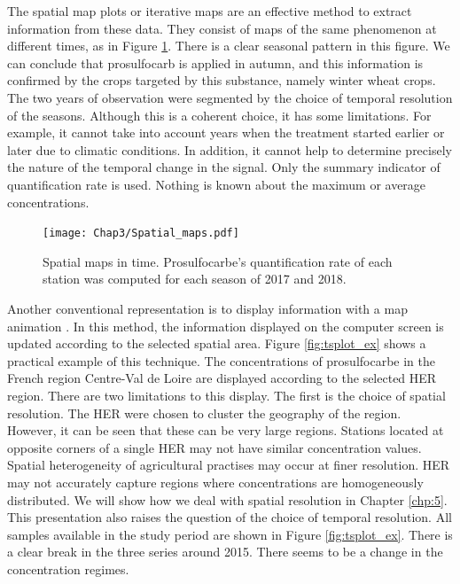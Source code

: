 The spatial map plots or iterative maps \citep{Andrienko2003} are an effective method to extract information from these data. They consist of maps of the same phenomenon at different times, as in Figure \ref{fig:spa_ex}. There is a clear seasonal pattern in this figure. We can conclude that prosulfocarb is applied in autumn, and this information is confirmed by the crops targeted by this substance, namely winter wheat crops. The two years of observation were segmented by the choice of temporal resolution of the seasons. Although this is a coherent choice, it has some limitations. For example, it cannot take into account years when the treatment started earlier or later due to climatic conditions. In addition, it cannot help to determine precisely the nature of the temporal change in the signal. Only the summary indicator of quantification rate is used. Nothing is known about the maximum or average concentrations.
 
\begin{figure}[ht]
    \centering
    \texttt{[image: Chap3/Spatial\_maps.pdf]}
    \caption{Spatial maps in time. Prosulfocarbe's quantification rate of each station was computed for each season of 2017 and 2018.}
    \label{fig:spa_ex}
\end{figure}

Another conventional representation is to display information with a map animation \citep{Andrienko2003}. In this method, the information displayed on the computer screen is updated according to the selected spatial area. Figure \ref{fig:tsplot_ex} shows a practical example of this technique. The concentrations of prosulfocarbe in the French region Centre-Val de Loire are displayed according to the selected HER region. There are two limitations to this display. The first is the choice of spatial resolution. The HER were chosen to cluster the geography of the region. However, it can be seen that these can be very large regions. Stations located at opposite corners of a single HER may not have similar concentration values. Spatial heterogeneity of agricultural practises may occur at finer resolution. HER may not accurately capture regions where concentrations are homogeneously distributed. We will show how we deal with spatial resolution in Chapter \ref{chp:5}. This presentation also raises the question of the choice of temporal resolution. All samples available in the study period are shown in Figure \ref{fig:tsplot_ex}. There is a clear break in the three series around 2015. There seems to be a change in the concentration regimes. \\

